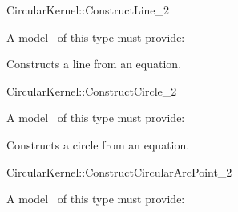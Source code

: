 
\begin{ccRefFunctionObjectConcept}{CircularKernel::ConstructLine_2}

\ccRefines


A model \ccVar\ of this type must provide:

{Constructs a line from an equation.}

\ccSeeAlso


\end{ccRefFunctionObjectConcept}
\begin{ccRefFunctionObjectConcept}{CircularKernel::ConstructCircle_2}

\ccRefines


A model \ccVar\ of this type must provide:

{Constructs a circle from an equation.}

\ccSeeAlso


\end{ccRefFunctionObjectConcept}
\begin{ccRefFunctionObjectConcept}{CircularKernel::ConstructCircularArcPoint_2}

A model \ccVar\ of this type must provide:

{}

{}

\end{ccRefFunctionObjectConcept}
